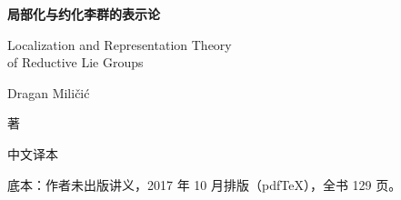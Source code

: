 \begin{titlepage}
\centering
\vspace*{3cm}
{\Huge\bfseries 局部化与约化李群的表示论\par}
\vspace{1.2cm}
{\Large Localization and Representation Theory\\[0.2em] of Reductive Lie Groups\par}
\vspace{2.5cm}
{\Large Dragan Miličić\par}
\vspace{0.6cm}
{\large 著\par}
\vspace{3cm}
{\large 中文译本\par}
\vfill
{\small 底本：作者未出版讲义，2017 年 10 月排版（pdf\TeX），全书 129 页。\par}
\end{titlepage}
